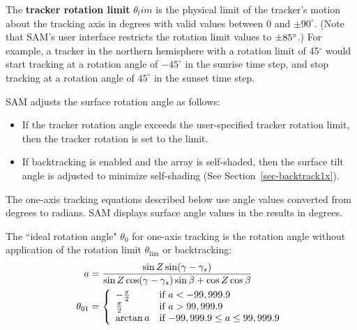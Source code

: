\documentclass[12pt,letterpaper]{article}
\begin{document}
The \textbf{tracker rotation limit} $\theta_lim$ is the physical limit of the tracker's motion about the tracking axis in degrees with valid values between $0$ and $\pm 90^\circ$. (Note that SAM's user interface restricts the rotation limit values to $\pm 85\degree$.) For example, a tracker in the northern hemisphere with a rotation limit of 45$^\circ$ would start tracking at a rotation angle of $-45^\circ$ in the sunrise time step, and stop tracking at a rotation angle of $45^\circ$ in the sunset time step.

SAM adjusts the surface rotation angle as follows:
\begin{itemize}
\item If the tracker rotation angle exceeds the user-specified tracker rotation limit, then the tracker rotation is set to the limit.
\item If backtracking is enabled and the array is self-shaded, then the surface tilt angle is adjusted to minimize self-shading (See Section~\ref{sec-backtrack1x}).
\end{itemize}

The one-axis tracking equations described below use angle values converted from degrees to radians. SAM displays surface angle values in the results in degrees.

The ``ideal rotation angle" $\theta_0$ for one-axis tracking is the rotation angle without application of the rotation limit $\theta_{\mathrm{lim}}$ or backtracking:
\begin{align}
a &= \frac{\sin Z \sin(\gamma - \gamma_s)}{\sin Z \cos(\gamma - \gamma_s) \sin\beta + \cos Z \cos\beta} \notag\\
\theta_{\mathrm{01}} &= \left\{
\begin{array}{ll}
-\frac{\pi}{2} & \text{if $a<-99,999.9$}\\
\frac{\pi}{2} & \text{if $a>99,999.9$}\\
\arctan a & \text{if $-99,999.9 \leq a \leq 99,999.9$}
\end{array}
\right.
\end{align}
\end{document}
